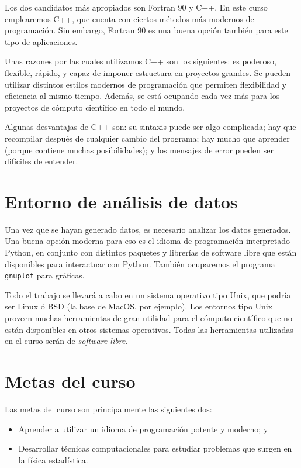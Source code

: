 Los dos candidatos más apropiados son Fortran 90 y C++. En este curso
emplearemos C++, que cuenta con ciertos métodos más modernos de programación.
Sin embargo, Fortran 90 es una buena opción también para este tipo de
aplicaciones. 

Unas razones por las cuales utilizamos C++ son los siguientes: es poderoso,
flexible, rápido, y capaz de imponer estructura en proyectos grandes. Se pueden
utilizar distintos estilos modernos de programación que permiten
  flexibilidad y eficiencia al mismo tiempo. Además, se está ocupando cada vez
más para los proyectos de cómputo científico en todo el mundo.

Algunas desvantajas de C++ son: su sintaxis puede ser algo complicada;
hay que recompilar después de cualquier cambio del
programa; hay mucho que aprender (porque contiene muchas posibilidades);
y los mensajes
de error pueden ser difíciles de entender.

\section{Entorno de análisis de datos}

Una vez que se hayan generado datos, es necesario analizar los datos generados.
Una buena opción moderna para eso es el idioma de programación interpretado
Python, en conjunto con distintos paquetes y librerías de software libre que
están disponibles para interactuar con Python.  También ocuparemos el programa
\texttt{gnuplot} para gráficas.

Todo el trabajo se llevará a cabo en un sistema operativo tipo Unix, que podría
ser Linux ó BSD (la base de MacOS, por ejemplo). Los entornos tipo Unix proveen
muchas herramientas de gran utilidad para el cómputo científico que no están
disponibles en otros sistemas operativos.  Todas las herramientas utilizadas en
el curso serán de \emph{software libre}.


\section{Metas del curso}
Las metas del curso son principalmente las siguientes dos:
\begin{itemize}
 \item Aprender a utilizar un idioma de programación potente y moderno; y
\item Desarrollar técnicas computacionales para estudiar problemas que surgen
en la física estadística.
\end{itemize}
